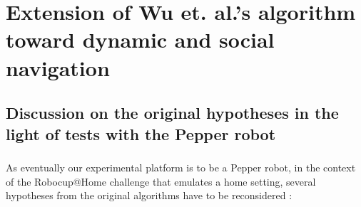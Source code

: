 
\chapter{Extension of Wu et. al.'s algorithm toward dynamic and social navigation} %

\label{Chapter4} %

\section{Discussion on the original hypotheses in the light of tests with the Pepper robot}

\paragraph{} As eventually our experimental platform is to be a Pepper robot, in the context of the Robocup@Home challenge that emulates a home setting, several hypotheses from the original algorithms have to be reconsidered :

